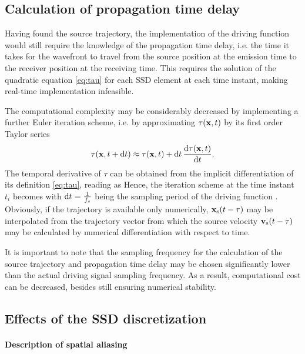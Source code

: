 \subsection{Calculation of propagation time delay}
	
Having found the source trajectory, the implementation of the driving function would still require the knowledge of the propagation time delay, i.e. the time it takes for the wavefront to travel from the source position at the emission time to the receiver position at the receiving time.
This requires the solution of the quadratic equation \eqref{eq:tau} for each SSD element at each time instant, making real-time implementation infeasible.

The computational complexity may be considerably decreased by implementing a further Euler iteration scheme, i.e. by approximating $\tau(\mathbf{x},t)$ by its first order Taylor series
\begin{equation}
\tau(\mathbf{x},t+\mathrm{d} t) \approx \tau(\mathbf{x},t) + \mathrm{d} t \, \frac{\mathrm{d} \tau(\mathbf{x},t)}{\mathrm{d} t}.
\end{equation}
The temporal derivative of $\tau$ can be obtained from the implicit differentiation of its definition \eqref{eq:tau}, reading as
Hence, the iteration scheme at the time instant $t_i$ becomes
with $\mathrm{d} t = \frac{1}{f_s}$ being the sampling period of the driving function \cite{doi:10.1121/1.4996126}.
Obviously, if the trajectory is available only numerically, $\mathbf{x}_{\mathrm{s}}(t-\tau)$ may be interpolated from the trajectory vector from which the source velocity $\mathbf{v}_{\mathrm{s}}(t-\tau)$ may be calculated by numerical differentiation with respect to time.

It is important to note that the sampling frequency for the calculation of the source trajectory and propagation time delay may be chosen significantly lower than the actual driving signal sampling frequency.
As a result, computational cost can be decreased, besides still ensuring numerical stability. 

\subsection{Effects of the SSD discretization}

\paragraph{Description of spatial aliasing}

